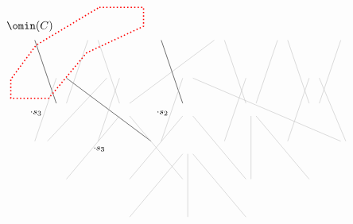 \documentclass[12pt, reqno]{amsart}
\theoremstyle{definition}
\numberwithin{equation}{section} \numberwithin{figure}{section}
\numberwithin{table}{section}
\begin{document}
\begin{figure}[t]
\[{\begin{tikzpicture}[baseline = 0mm, scale = 0.8]
\draw [black] (-\wtab*2-\wp,4*\htab-\hp) -- (-\wtab/2*5+\wp,3*\htab+\hp);
\draw [lightgray] (-\wtab*2+\wp,4*\htab-\hp) -- (-\wtab/2*3-\wp,3*\htab+\hp);
\node at (-2.4*\wtab, 3.75*\htab-\hp) {\color{black}\footnotesize $\cdot s_3$};
\draw [lightgray] (-\wtab-\wp,4*\htab-\hp) -- (-\wtab/2*3+\wp,3*\htab+\hp);
\draw [lightgray] (-\wtab+\wp,4*\htab-\hp) -- (\wtab/2-\wp,3*\htab+\hp);
\draw [black] (-\wp,4*\htab-\hp) -- (-\wtab/2+\wp,3*\htab+\hp);
\node at (-0.4*\wtab, 3.75*\htab-\hp) {\color{black}\footnotesize $\cdot s_2$};
\draw [lightgray] (\wtab-\wp,4*\htab-\hp) -- (\wtab/2+\wp,3*\htab+\hp);
\draw [lightgray] (\wtab+\wp,4*\htab-\hp) -- (\wtab/2*3-\wp,3*\htab+\hp);
\draw [lightgray] (2*\wtab-\wp,4*\htab-\hp) -- (\wtab/2*3+\wp,3*\htab+\hp);
\draw [lightgray] (2*\wtab+\wp,4*\htab-\hp) -- (\wtab/2*5-\wp,3*\htab+\hp);

\draw [lightgray] (-\wtab/2*5+\wp,3*\htab-\hp) -- (-\wtab*2-\wp,2*\htab+\hp);
\draw [lightgray] (-\wtab*2.3+\wp,3*\htab-\hp) -- (-1.2*\wtab-\wp,2*\htab+\hp);
\draw [black] (-\wtab/2-\wp,3*\htab-\hp) -- (-\wtab*2+\wp,2*\htab+\hp);
\node at (-1.4*\wtab, 2.8*\htab-\hp) {\color{black}\footnotesize $\cdot s_3$};
\draw [lightgray] (-\wtab/2+\wp,3*\htab-\hp) -- (-\wp,2*\htab+\hp);
\draw [lightgray] (\wtab/2+\wp,3*\htab-\hp) -- (\wtab-\wp,2*\htab+\hp);
\draw [lightgray] (\wtab/2*3+\wp,3*\htab-\hp) -- (\wtab*2-\wp,2*\htab+\hp);
\draw [lightgray] (\wtab/2*5-\wp,3*\htab-\hp) -- (\wp,2*\htab+\hp);
\draw [lightgray] (\wtab/2*5,3*\htab-\hp) -- (\wtab*2+\wp,2*\htab+\hp);
\draw [lightgray] (-\wtab/2*3+\wp,3*\htab-\hp) -- (-\wtab-\wp,2*\htab+\hp);

\draw [lightgray] (-\wtab*2+\wp,2*\htab-\hp) -- (-\wtab-\wp, \htab+\hp);
\draw [lightgray] (-\wp,2*\htab-\hp) -- (-\wtab+\wp, \htab+\hp);
\draw [lightgray] (\wtab-\wp,2*\htab-\hp) -- (\wp, \htab+\hp);
\draw [lightgray] (\wtab,2*\htab-\hp) -- (\wtab, \htab+\hp);
\draw [lightgray] (2*\wtab-\wp,2*\htab-\hp) -- (\wtab+\wp, \htab+\hp);
\draw [lightgray] (-\wtab+\wp,2*\htab-\hp) -- (-\wp, \htab+\hp);

\draw [lightgray] (-\wtab+\wp,\htab-\hp) -- (-\wp, \hp);
\draw [lightgray] (0,\htab-\hp) -- (0, \hp);
\draw [lightgray] (\wtab-\wp,\htab-\hp) -- (\wp, \hp);

\draw [dotted, red, line width=0.4mm] 
(-1.4*\wtab,5.2*\htab)
-- (-0.7*\wtab,5.2*\htab)
-- (-0.7*\wtab,4.7*\htab)
-- (-1.6*\wtab,4*\htab)
-- (-2.2*\wtab,2.8*\htab)
-- (-2.8*\wtab,2.8*\htab)
-- (-2.8*\wtab,3.3*\htab)
-- (-2.4*\wtab,4.2*\htab)
-- (-1.4*\wtab,5.2*\htab);
\node at (-2.5*\wtab, 4.7*\htab) {$\omin(C)$};


\end{tikzpicture}}\]
\end{figure}
\end{document}
